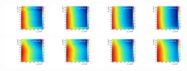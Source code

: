 \begin{figure}[htbp]
  \includegraphics[width=0.2\textwidth]{fig/analysisAppendix/template_nonRes_mu_HP_vbf_LDy.pdf}
  \includegraphics[width=0.2\textwidth]{fig/analysisAppendix/template_nonRes_e_HP_vbf_LDy.pdf}
  \includegraphics[width=0.2\textwidth]{fig/analysisAppendix/template_nonRes_mu_LP_vbf_LDy.pdf}
  \includegraphics[width=0.2\textwidth]{fig/analysisAppendix/template_nonRes_e_LP_vbf_LDy.pdf}\\
  \includegraphics[width=0.2\textwidth]{fig/analysisAppendix/template_nonRes_mu_HP_bb_HDy.pdf}
  \includegraphics[width=0.2\textwidth]{fig/analysisAppendix/template_nonRes_e_HP_bb_HDy.pdf}
  \includegraphics[width=0.2\textwidth]{fig/analysisAppendix/template_nonRes_mu_LP_bb_HDy.pdf}
  \includegraphics[width=0.2\textwidth]{fig/analysisAppendix/template_nonRes_e_LP_bb_HDy.pdf}\\

\end{figure}
